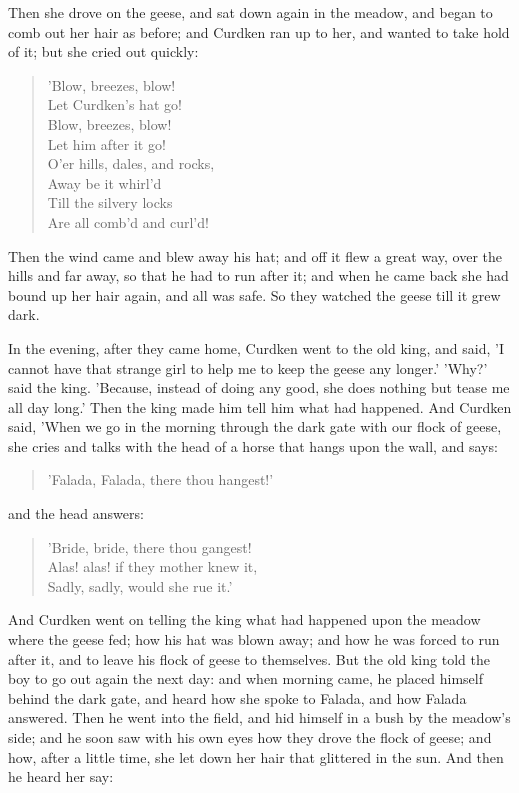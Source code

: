 \documentclass[12pt]{book}
\begin{document}
Then she drove on the geese, and sat down again in the meadow, and
began to comb out her hair as before; and Curdken ran up to her, and
wanted to take hold of it; but she cried out quickly:

\begin{verse}
 'Blow, breezes, blow!\\
  Let Curdken's hat go!\\
  Blow, breezes, blow!\\
  Let him after it go!\\
  O'er hills, dales, and rocks,\\
  Away be it whirl'd\\
  Till the silvery locks\\
  Are all comb'd and curl'd!
\end{verse}

Then the wind came and blew away his hat; and off it flew a great way,
over the hills and far away, so that he had to run after it; and when
he came back she had bound up her hair again, and all was safe. So
they watched the geese till it grew dark.

In the evening, after they came home, Curdken went to the old king,
and said, 'I cannot have that strange girl to help me to keep the
geese any longer.' 'Why?' said the king. 'Because, instead of doing
any good, she does nothing but tease me all day long.' Then the king
made him tell him what had happened. And Curdken said, 'When we go in
the morning through the dark gate with our flock of geese, she cries
and talks with the head of a horse that hangs upon the wall, and says:

\begin{verse}
 'Falada, Falada, there thou hangest!'
\end{verse}

and the head answers:

\begin{verse}
 'Bride, bride, there thou gangest!\\
  Alas! alas! if they mother knew it,\\
  Sadly, sadly, would she rue it.'
\end{verse}

And Curdken went on telling the king what had happened upon the meadow
where the geese fed; how his hat was blown away; and how he was forced
to run after it, and to leave his flock of geese to themselves. But
the old king told the boy to go out again the next day: and when
morning came, he placed himself behind the dark gate, and heard how
she spoke to Falada, and how Falada answered. Then he went into the
field, and hid himself in a bush by the meadow's side; and he soon saw
with his own eyes how they drove the flock of geese; and how, after a
little time, she let down her hair that glittered in the sun. And then
he heard her say:
\end{document}
